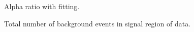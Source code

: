 \documentclass[12pt]{article} %
\begin{document}
\begin{figure}[H]
  \caption{Alpha ratio with fitting.}
  \label{fig:alp}
\end{figure}

\begin{figure}[H]
  \caption{Total number of background events in signal region of data.}
  \label{fig:num}
\end{figure}
\end{document}
